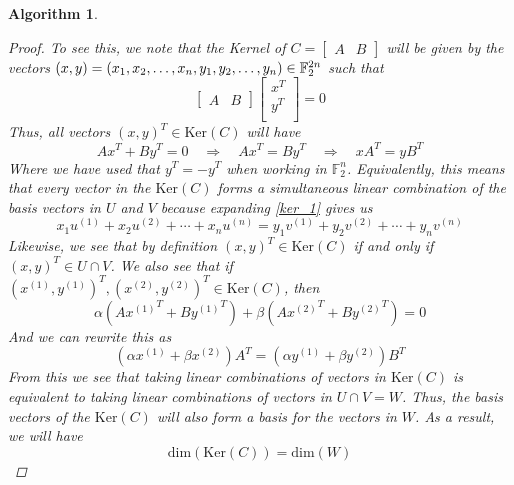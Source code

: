 \documentclass[11pt]{article}
\newtheorem{algorithm}{Algorithm}
\theoremstyle{definition}
\theoremstyle{plain}
\begin{document}
\begin{algorithm}
\begin{proof}
  To see this, we note that the Kernel of $C = \begin{bmatrix} A & B \end{bmatrix}$ will be given by the vectors $(x, y) = \\(x_1, x_2, \ldots, x_n, y_1, y_2, \ldots, y_n) \in \mathbb{F}_2^{2n}$ such that
\begin{equation}
  \begin{bmatrix}
    A & B 
  \end{bmatrix}
  \begin{bmatrix}
    x^T \\ 
    y^T \\ 
  \end{bmatrix}
  = 0 
\end{equation}
Thus, all vectors ${(x, y)}^T \in \text{Ker}(C)$ will have 
\begin{equation}\label{ker_1}
  Ax^T + By^T = 0 \quad \Rightarrow \quad Ax^T = By^T
  \quad \Rightarrow \quad xA^T = yB^T
\end{equation}
Where we have used that $y^T = -y^T$ when working in $\mathbb{F}_2^n$. Equivalently, this means that every vector in the $\text{Ker}(C)$ forms a simultaneous linear combination of the basis vectors in $U$ and $V$ because expanding {\ref{ker_1}} gives us
\begin{equation}
  x_1 u^{(1)} + x_2 u^{(2)} + \cdots + x_n u^{(n)} =
  y_1 v^{(1)} + y_2 v^{(2)} + \cdots + y_n v^{(n)} 
\end{equation}
Likewise, we see that by definition ${(x, y)}^T \in \text{Ker}(C)$ if and only if ${(x, y)}^T \in U \cap V$. We also see that if ${(x^{(1)}, y^{(1)})}^T, {(x^{(2)}, y^{(2)})}^T \in \text{Ker}(C)$, then 
\begin{equation}
\alpha (A {x^{(1)}}^T + B {y^{(1)}}^T) + \beta (A {x^{(2)}}^T + B {y^{(2)}}^T) = 0
\end{equation}
And we can rewrite this as
\begin{equation}
(\alpha {x^{(1)}} + \beta {x^{(2)}})A^T =(\alpha {y^{(1)}} + \beta {y^{(2)}})B^T
\end{equation}
From this we see that taking linear combinations of vectors in $\text{Ker}(C)$ is equivalent to taking linear combinations of vectors in $U \cap V = W$. Thus, the basis vectors of the $\text{Ker}(C)$ will also form a basis for the vectors in $W$. As a result, we will have
\begin{equation}\label{algo_proof_1}
  \text{dim}(\text{Ker}(C)) = \text{dim}(W)
\end{equation}

\end{proof}
\end{algorithm}
\end{document}
